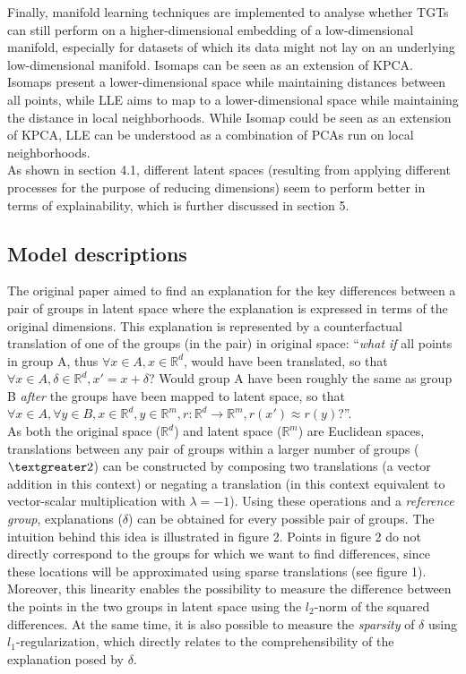 Finally, manifold learning techniques are implemented to analyse whether TGTs can still perform on a higher-dimensional embedding of a low-dimensional manifold, especially for datasets of which its data might not lay on an underlying low-dimensional manifold. Isomaps can be seen as an extension of KPCA. Isomaps present a lower-dimensional space while maintaining distances between all points, while LLE aims to map to a lower-dimensional space while maintaining the distance in local neighborhoods. While Isomap could be seen as an extension of KPCA, LLE can be understood as a combination of PCAs run on local neighborhoods.\\

As shown in section 4.1, different latent spaces (resulting from applying different processes for the purpose of reducing dimensions) seem to perform better in terms of explainability, which is further discussed in section 5.


\subsection{Model descriptions}
The original paper aimed to find an explanation for the key differences between a pair of groups in latent space where the explanation is expressed in terms of the original dimensions. This explanation is represented by a counterfactual translation of one of the groups (in the pair) in original space: ``\textit{what if} all points in group A, thus $\forall x \in A, x \in \mathbb{R}^d$, would have been translated, so that $\forall x \in A, \delta \in \mathbb{R}^d, x' = x + \delta$? Would group A have been roughly the same as group B \textit{after} the groups have been mapped to latent space, so that $\forall x \in A, \forall y \in B, x \in \mathbb{R}^d, y \in \mathbb{R}^m, r: \mathbb{R}^d \to \mathbb{R}^m, r(x') \approx r(y)$?''.\\

As both the original space ($\mathbb{R}^d$) and latent space ($\mathbb{R}^m$) are Euclidean spaces, translations between any pair of groups within a larger number of groups ($\textgreater 2$) can be constructed by composing two translations (a vector addition in this context) or negating a translation (in this context equivalent to vector-scalar multiplication with $\lambda = -1$). Using these operations and a \textit{reference group}, explanations ($\delta$) can be obtained for every possible pair of groups. The intuition behind this idea is illustrated in figure 2. Points in figure 2 do not directly correspond to the groups for which we want to find differences, since these locations will be approximated using sparse translations (see figure 1). Moreover, this linearity enables the possibility to measure the difference between the points in the two groups in latent space using the $l_2$-norm of the squared differences. At the same time, it is also possible to measure the \textit{sparsity} of $\delta$ using $l_1$-regularization, which directly relates to the comprehensibility of the explanation posed by $\delta$.\\

